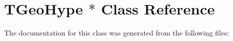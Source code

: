 \hypertarget{class_t_geo_hype_01_5}{}\section{T\+Geo\+Hype $\ast$ Class Reference}
\label{class_t_geo_hype_01_5}


The documentation for this class was generated from the following files\+: